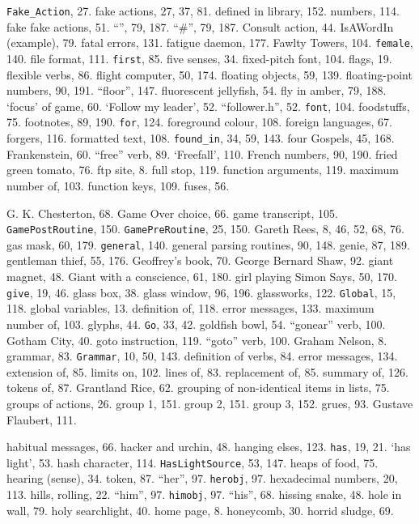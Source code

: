 {{{{{\tt Fake\_Action}}, 27.
fake actions, 27, 37, 81.
\quad  defined in library, 152.
\quad  numbers, 114.
fake fake actions, 51.
``{\fam \ttfam \ninett *}'', 79, 187.
``{\fam \ttfam \ninett \#}'', 79, 187.
{\fam \ttfam \tentt Consult} action, 44.
{\fam \ttfam \tentt IsAWordIn} (example), 79.
fatal errors, 131.
fatigue daemon, 177.
Fawlty Towers, 104.
{{\tt female}}, 140.
file format, 111.
{{\tt first}}, 85.
five senses, 34.
fixed-pitch font, 104.
flags, 19.
flexible verbs, 86.
flight computer, 50, 174.
floating objects, 59, 139.
floating-point numbers, 90, 191.
``floor'', 147.
fluorescent jellyfish, 54.
fly in amber, 79, 188.
`focus' of game, 60.
`Follow my leader', 52.
``follower.h'', 52.
{{\tt font}}, 104.
foodstuffs, 75.
footnotes, 89, 190.
{{\tt for}}, 124.
foreground colour, 108.
foreign languages, 67.
forgers, 116.
formatted text, 108.
{{\tt found\_in}}, 34, 59, 143.
four Gospels, 45, 168.
Frankenstein, 60.
``free'' verb, 89.
`Freefall', 110.
French numbers, 90, 190.
fried green tomato, 76.
ftp site, 8.
full stop, 119.
function arguments, 119.
\quad  maximum number of, 103.
function keys, 109.
fuses, 56.

G. K. Chesterton, 68.
Game Over choice, 66.
game transcript, 105.
{{\tt GamePostRoutine}}, 150.
{{\tt GamePreRoutine}}, 25, 150.
Gareth Rees, 8, 46, 52, 68, 76.
gas mask, 60, 179.
{{\tt general}}, 140.
general parsing routines, 90, 148.
genie, 87, 189.
gentleman thief, 55, 176.
Geoffrey's book, 70.
George Bernard Shaw, 92.
giant magnet, 48.
Giant with a conscience, 61, 180.
girl playing Simon Says, 50, 170.
{{\tt give}}, 19, 46.
glass box, 38.
glass window, 96, 196.
glassworks, 122.
{{\tt Global}}, 15, 118.
global variables, 13.
\quad  definition of, 118.
\quad  error messages, 133.
\quad  maximum number of, 103.
glyphs, 44.
{{\tt Go}}, 33, 42.
goldfish bowl, 54.
``gonear'' verb, 100.
Gotham City, 40.
goto instruction, 119.
``goto'' verb, 100.
Graham Nelson, 8.
grammar, 83.
{{\tt Grammar}}, 10, 50, 143.
\quad  definition of verbs, 84.
\quad  error messages, 134.
\quad  extension of, 85.
\quad  limits on, 102.
\quad  lines of, 83.
\quad  replacement of, 85.
\quad  summary of, 126.
\quad  tokens of, 87.
Grantland Rice, 62.
grouping of non-identical items in lists, 75.
groups of actions, 26.
\quad  group 1, 151.
\quad  group 2, 151.
\quad  group 3, 152.
grues, 93.
Gustave Flaubert, 111.

habitual messages, 66.
hacker and urchin, 48.
hanging elses, 123.
{{\tt has}}, 19, 21.
`has light', 53.
hash character, 114.
{{\tt HasLightSource}}, 53, 147.
heaps of food, 75.
hearing (sense), 34.
 token, 87.
``her'', 97.
{{\tt herobj}}, 97.
hexadecimal numbers, 20, 113.
hills, rolling, 22.
``him'', 97.
{{\tt himobj}}, 97.
``his'', 68.
hissing snake, 48.
hole in wall, 79.
holy searchlight, 40.
home page, 8.
honeycomb, 30.
horrid sludge, 69.

}}}
